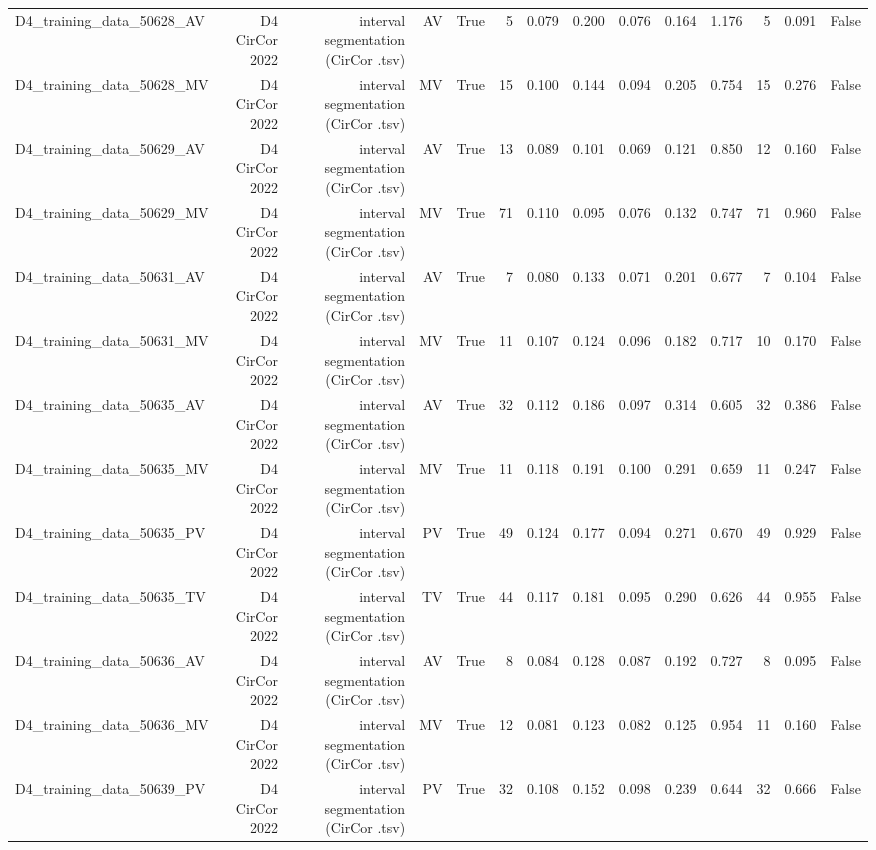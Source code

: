 \begin{table}[htbp]
\begin{tabular}{lrrrrrrrrrrrrr}
    D4\_training\_data\_50628\_AV & D4 CirCor 2022 & interval segmentation (CirCor .tsv) & AV & True & 5 & 0.079 & 0.200 & 0.076 & 0.164 & 1.176 & 5 & 0.091 & False \\
    D4\_training\_data\_50628\_MV & D4 CirCor 2022 & interval segmentation (CirCor .tsv) & MV & True & 15 & 0.100 & 0.144 & 0.094 & 0.205 & 0.754 & 15 & 0.276 & False \\
    D4\_training\_data\_50629\_AV & D4 CirCor 2022 & interval segmentation (CirCor .tsv) & AV & True & 13 & 0.089 & 0.101 & 0.069 & 0.121 & 0.850 & 12 & 0.160 & False \\
    D4\_training\_data\_50629\_MV & D4 CirCor 2022 & interval segmentation (CirCor .tsv) & MV & True & 71 & 0.110 & 0.095 & 0.076 & 0.132 & 0.747 & 71 & 0.960 & False \\
    D4\_training\_data\_50631\_AV & D4 CirCor 2022 & interval segmentation (CirCor .tsv) & AV & True & 7 & 0.080 & 0.133 & 0.071 & 0.201 & 0.677 & 7 & 0.104 & False \\
    D4\_training\_data\_50631\_MV & D4 CirCor 2022 & interval segmentation (CirCor .tsv) & MV & True & 11 & 0.107 & 0.124 & 0.096 & 0.182 & 0.717 & 10 & 0.170 & False \\
    D4\_training\_data\_50635\_AV & D4 CirCor 2022 & interval segmentation (CirCor .tsv) & AV & True & 32 & 0.112 & 0.186 & 0.097 & 0.314 & 0.605 & 32 & 0.386 & False \\
    D4\_training\_data\_50635\_MV & D4 CirCor 2022 & interval segmentation (CirCor .tsv) & MV & True & 11 & 0.118 & 0.191 & 0.100 & 0.291 & 0.659 & 11 & 0.247 & False \\
    D4\_training\_data\_50635\_PV & D4 CirCor 2022 & interval segmentation (CirCor .tsv) & PV & True & 49 & 0.124 & 0.177 & 0.094 & 0.271 & 0.670 & 49 & 0.929 & False \\
    D4\_training\_data\_50635\_TV & D4 CirCor 2022 & interval segmentation (CirCor .tsv) & TV & True & 44 & 0.117 & 0.181 & 0.095 & 0.290 & 0.626 & 44 & 0.955 & False \\
    D4\_training\_data\_50636\_AV & D4 CirCor 2022 & interval segmentation (CirCor .tsv) & AV & True & 8 & 0.084 & 0.128 & 0.087 & 0.192 & 0.727 & 8 & 0.095 & False \\
    D4\_training\_data\_50636\_MV & D4 CirCor 2022 & interval segmentation (CirCor .tsv) & MV & True & 12 & 0.081 & 0.123 & 0.082 & 0.125 & 0.954 & 11 & 0.160 & False \\
    D4\_training\_data\_50639\_PV & D4 CirCor 2022 & interval segmentation (CirCor .tsv) & PV & True & 32 & 0.108 & 0.152 & 0.098 & 0.239 & 0.644 & 32 & 0.666 & False \\

\end{tabular}
\end{table}
